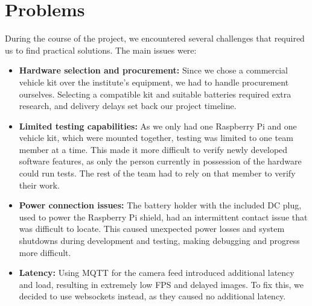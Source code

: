 \section{Problems}


During the course of the project, we encountered several challenges that required us to find practical solutions. The main issues were:

\begin{itemize}
    \item \textbf{Hardware selection and procurement:}
    Since we chose a commercial vehicle kit over the institute’s equipment, we had to handle procurement ourselves. Selecting a compatible kit and suitable batteries required extra research, and delivery delays set back our project timeline.

    \item \textbf{Limited testing capabilities:}
    As we only had one Raspberry Pi and one vehicle kit, which were mounted together, testing was limited to one team member at a time. This made it more difficult to verify newly developed software features, as only the person currently in possession of the hardware could run tests. The rest of the team had to rely on that member to verify their work.

    \item \textbf{Power connection issues:}
    The battery holder with the included DC plug, used to power the Raspberry Pi shield, had an intermittent contact issue that was difficult to locate. This caused unexpected power losses and system shutdowns during development and testing, making debugging and progress more difficult.

    \item \textbf{Latency:}
    Using MQTT for the camera feed introduced additional latency and load, resulting in extremely low FPS and delayed images.
    To fix this, we decided to use websockets instead, as they caused no additional latency.
\end{itemize}